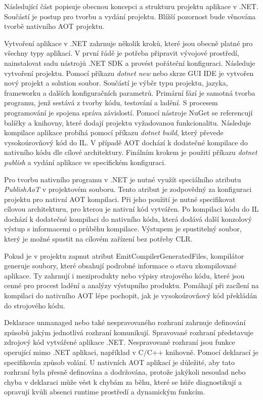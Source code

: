 Následující část popisuje obecnou koncepci a strukturu projektu aplikace v .NET. Součástí je postup pro tvorbu a vydání projektu. Blížší pozornost bude věnována tvorbě nativního AOT projektu.


Vytvoření aplikace v .NET zahrnuje několik kroků, které jsou obecně platné pro všechny typy aplikací. V první řádě je potřeba připravit vývojové prostředí, nainstalovat sadu nástrojů .NET SDK a provést pořáteční konfiguraci. Následuje vytvoření projektu. Pomocí příkazu \emph{dotnet new} nebo skrze GUI IDE je vytvořen nový projekt a solution soubor. Součástí je výběr typu projektu, jazyka, frameworku a dalších konfiguračních parametrů. Primární fází je samotná tvorba programu, jenž sestává z tvorby kódu, testování a ladění. \cite{Price2023} S procesem programování je spojena správa závislostí. Pomocí nástroje NuGet se referencují balíčky a knihovny, které dodají projektu vyžadovanou funkcionalitu. Následuje kompilace aplikace probíhá pomocí příkazu \emph{dotnet build}, který převede vysokoúrovňový kód do IL. V případě AOT dochází k dodatečné kompilace do nativního kódu dle cílové architektury. Finálním krokem je použití příkazu \emph{dotnet publish} a vydání aplikace ve specifickém konfiguraci. 


Pro tvorbu nativního programu v .NET je nutné využít speciálního atributu \emph{PublishAoT} v projektovém souboru. Tento atribut je zodpovědný za konfiguraci projektu pro nativní AOT kompilaci. Při jeho použití je nutné specifikovat cílovou architekturu, pro kterou je nativní kód vytvářen. Po kompilaci kódu do IL dochází k dodatečné kompilaci do nativního kódu, která dodává další konzolový výstup s informacemi o průběhu kompilace. Výstupem je spustitelný soubor, který je možné spustit na cílovém zařízení bez potřeby CLR. 

Pokud je v projektu zapnut atribut EmitCompilerGeneratedFiles, kompilátor generuje soubory, které obsahují podrobné informace o stavu zkompilované aplikace. Ty zahrnují i meziprodukty nebo výpisy strojového kódu, které jsou cenné pro procest ladění a analýzy výstupního produktu. \cite{netdocssg} Pomáhají při zacílení na kompilaci do nativního AOT lépe pochopit, jak je vysokoúrovňový kód překládán do strojového kódu. 

Deklarace unmanaged nebo také nespravovaného rozhraní zahrnuje definování způsobů jakým jednotlivá rozhraní komunikují. Spravované rozhraní představuje zdrojový kód vytvářené aplikace .NET. Nespravované rozhraní jsou funkce operující mimo .NET aplikaci, například v C/C++ knihovně. \cite{Troelsen2003} Pomocí deklarací je specifikován způsob volání. U nativních AOT aplikací je důležité, aby tato rozhraní byla přesně definována a dodržována, protože jakýkoli nesoulad nebo chyba v deklaraci může vést k chybám za běhu, které se hůře diagnostikují a opravují kvůli absenci runtime prostředí a dynamickým funkcím.

